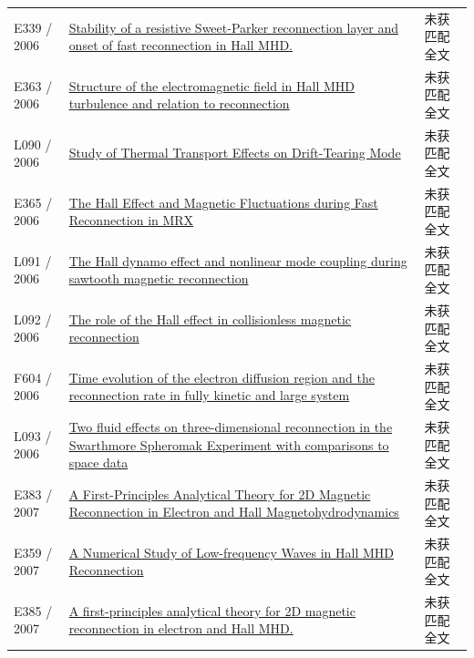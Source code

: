 \documentclass[UTF8,a4paper,11pt,openany,fontset=fandol]{ctexbook}
\begin{document}
\begin{longtable}{P{24mm}P{97mm}P{27mm}}
E339 / 2006 & \href{http://absimage.aps.org/image/DPP06/MWS_DPP06-2006-000316.pdf}{Stability of a resistive Sweet-Parker reconnection layer and onset of fast reconnection in Hall MHD.} & 未获匹配全文\\

E363 / 2006 & \href{http://ui.adsabs.harvard.edu/abs/2006AGUFMSM41A1454D/abstract}{Structure of the electromagnetic field in Hall MHD turbulence and relation to reconnection} & 未获匹配全文\\

L090 / 2006 & \href{https://doi.org/10.15017/26818}{Study of Thermal Transport Effects on Drift-Tearing Mode} & 未获匹配全文\\

E365 / 2006 & \href{http://absimage.aps.org/image/DPP06/MWS_DPP06-2006-000815.pdf}{The Hall Effect and Magnetic Fluctuations during Fast Reconnection in MRX} & 未获匹配全文\\

L091 / 2006 & \href{https://doi.org/10.1063/1.2363353}{The Hall dynamo effect and nonlinear mode coupling during sawtooth magnetic reconnection} & 未获匹配全文\\

L092 / 2006 & \href{https://doi.org/10.1016/j.asr.2004.11.045}{The role of the Hall effect in collisionless magnetic reconnection} & 未获匹配全文\\

F604 / 2006 & \href{https://doi.org/10.1063/1.2220534}{Time evolution of the electron diffusion region and the reconnection rate in fully kinetic and large system} & 未获匹配全文\\

L093 / 2006 & \href{https://doi.org/10.1063/1.2180729}{Two fluid effects on three-dimensional reconnection in the Swarthmore Spheromak Experiment with comparisons to space data} & 未获匹配全文\\

E383 / 2007 & \href{http://ui.adsabs.harvard.edu/abs/2007AGUFMSH44A1721C/abstract}{A First-Principles Analytical Theory for 2D Magnetic Reconnection in Electron and Hall Magnetohydrodynamics} & 未获匹配全文\\

E359 / 2007 & \href{https://doi.org/10.1016/j.chinastron.2007.10.004}{A Numerical Study of Low-frequency Waves in Hall MHD Reconnection} & 未获匹配全文\\

E385 / 2007 & \href{http://absimage.aps.org/image/DPP07/MWS_DPP07-2007-000437.pdf}{A first-principles analytical theory for 2D magnetic reconnection in electron and Hall MHD.} & 未获匹配全文\\


\end{longtable}
\end{document}

